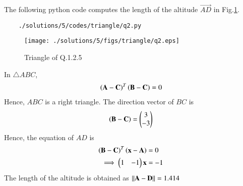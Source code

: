 	The following python code computes the length of the altitude $\vec{AD}$ in Fig.\ref{fig:1.2.5_qtwo}.
	\begin{lstlisting}
	./solutions/5/codes/triangle/q2.py
	\end{lstlisting}
	
	\begin{figure}[!ht]
	\centering
	\texttt{[image: ./solutions/5/figs/triangle/q2.eps]}
	\caption{Triangle of Q.1.2.5}
	\label{fig:1.2.5_qtwo}	
	\end{figure}
	
In $\triangle ABC$, 
	\begin{align}
\left(\mathbf{A}-\mathbf{C}\right)^T\left(\mathbf{B}-\mathbf{C}\right) = 0
	\end{align}
Hence, $ABC$ is a right triangle. The direction vector of $BC$ is 
\begin{align}
\left(\mathbf{B}-\mathbf{C}\right) = \begin{pmatrix}3\\-3\end{pmatrix}
\end{align}
Hence, the equation of $AD$ is 
\begin{align}
\left(\mathbf{B}-\mathbf{C}\right)^T \left(\mathbf{x}-\mathbf{A}\right) &= 0
\\
\implies 		\begin{pmatrix}1&-1\end{pmatrix}\mathbf{x} &= -1
\end{align}
The length of the altitude is obtained as $\left\lVert\mathbf{A-D}\right\rVert = 1.414$
	
	
	
	
